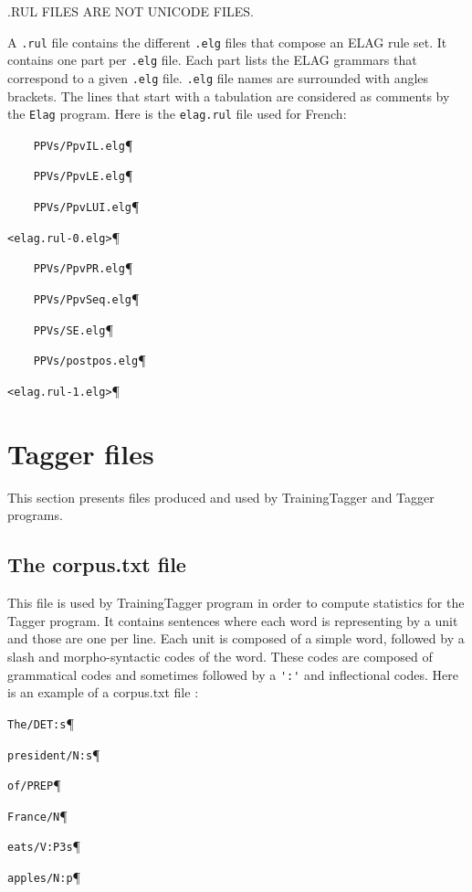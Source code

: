 .RUL FILES ARE NOT UNICODE FILES.

\bigskip
\noindent A \verb$.rul$ file contains the different \verb$.elg$ files that compose an ELAG
rule set. It contains one part per \verb$.elg$ file. Each part lists the ELAG
grammars that correspond to a given \verb$.elg$ file. \verb$.elg$ file names are
surrounded with angles brackets. The lines that start with a tabulation are
considered as comments by the \verb+Elag+
program. Here is the
\verb$elag.rul$ file used for French:

\bigskip
\verb$    PPVs/PpvIL.elg$\P

\verb$    PPVs/PpvLE.elg$\P

\verb$    PPVs/PpvLUI.elg$\P

\verb$<elag.rul-0.elg>$\P

\verb$    PPVs/PpvPR.elg$\P

\verb$    PPVs/PpvSeq.elg$\P

\verb$    PPVs/SE.elg$\P

\verb$    PPVs/postpos.elg$\P

\verb$<elag.rul-1.elg>$\P

\section{Tagger files}
This section presents files produced and used by TrainingTagger and Tagger programs.

\subsection{The corpus.txt file}
\label{section-corpus-file}
This file is used by TrainingTagger program in order to compute statistics for the Tagger program. It contains sentences 
where each word is representing by a unit and those are one per line. Each unit is composed of a simple word, 
followed by a slash and morpho-syntactic codes of the word. These codes are composed of 
grammatical codes and sometimes followed by a \verb+':'+ and inflectional codes. Here is an example of a corpus.txt file :

\bigskip
\verb+The/DET:s+\P

\verb+president/N:s+\P

\verb+of/PREP+\P

\verb+France/N+\P

\verb+eats/V:P3s+\P

\verb+apples/N:p+\P

